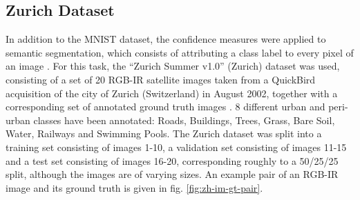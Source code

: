 \documentclass[10pt]{article}
\begin{document}
\subsection{Zurich Dataset}
\label{subsec:data-zurich}
In addition to the \gls{MNIST} dataset, the confidence measures were applied to semantic segmentation, which consists of attributing a class label to every pixel of an image \cite{Volpi2017DenseSL}. For this task, the ``Zurich Summer v1.0'' (Zurich) dataset was used, consisting of a set of 20 RGB-\gls{IR} satellite images taken from a QuickBird acquisition of the city of Zurich (Switzerland) in August 2002, together with a corresponding set of annotated ground truth images \cite{Volpi2015SemanticSO}. 8 different urban and peri-urban classes have been annotated: Roads, Buildings, Trees, Grass, Bare Soil, Water, Railways and Swimming Pools. The Zurich dataset was split into a training set consisting of images 1-10, a validation set consisting of images 11-15 and a test set consisting of images 16-20, corresponding roughly to a 50/25/25 split, although the images are of varying sizes. An example pair of an RGB-\gls{IR} image and its ground truth is given in fig. \ref{fig:zh-im-gt-pair}.
\end{document}
